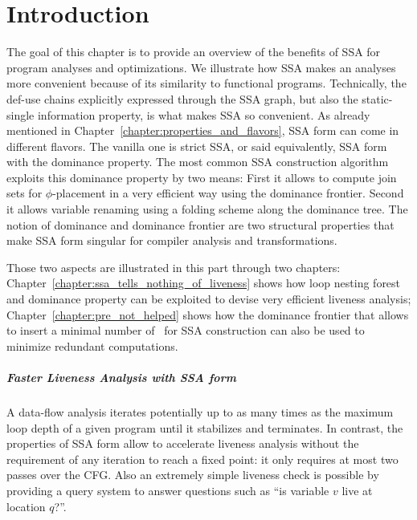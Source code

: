 \chapter{Introduction
  }
\label{chapter:analysis}

The goal of this chapter is to provide an overview of the benefits of
SSA for program analyses and optimizations. We illustrate how SSA
makes an analyses more convenient because of its similarity to
functional programs. Technically, the def-use chains explicitly
expressed through the SSA graph, but also the static-single
information property, is what makes SSA so convenient.
As already mentioned in Chapter~\ref{chapter:properties_and_flavors},
SSA form can come in different flavors. The vanilla one is strict SSA, or said
equivalently, SSA form with the dominance property. The most common SSA
construction algorithm exploits this dominance property by two means:
First it allows to compute join sets for $\phi$-placement in a very
efficient way using the dominance frontier.  Second it allows variable
renaming using a folding scheme along the dominance tree.  The notion
of dominance and dominance frontier are two structural properties that
make SSA form singular for compiler analysis and transformations.

Those two aspects are illustrated in this part through two chapters:
Chapter~\ref{chapter:ssa_tells_nothing_of_liveness} shows how loop
nesting forest and dominance property can be exploited to devise very
efficient liveness analysis; Chapter~\ref{chapter:pre_not_helped}
shows how the dominance frontier that allows to insert a minimal number of
\phifun\ for SSA construction can also be used to minimize redundant
computations.

\paragraph{Faster Liveness Analysis with SSA form}
A data-flow analysis iterates potentially up to as many times as the
maximum loop depth of a given program until it stabilizes and
terminates. In contrast, the properties of SSA form allow to
accelerate liveness analysis without the requirement of any iteration
to reach a fixed point: it only requires at most two passes over the
CFG. Also an extremely simple liveness check is possible by providing
a query system to answer questions such as ``is variable $v$ live at
location $q$?''.

